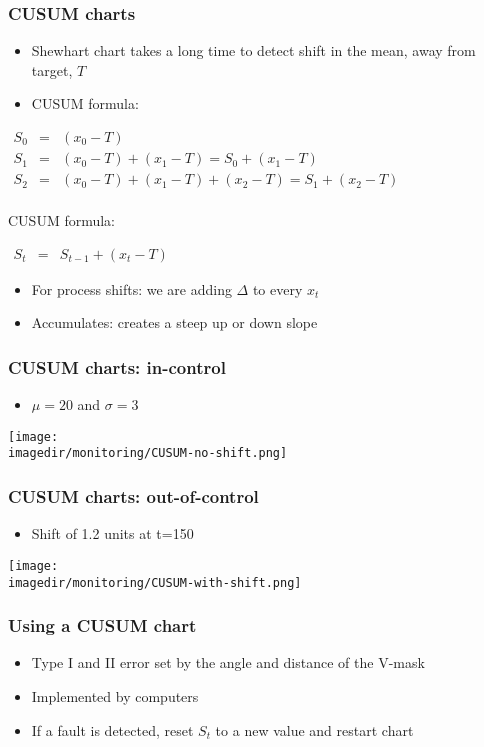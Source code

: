 \begin{frame}\frametitle{CUSUM charts}
	\begin{itemize}
		\item	Shewhart chart takes a long time to detect shift in the mean, away from target, $T$ 
		\item	CUSUM formula: 
	\end{itemize}
	$ 
	\begin{array}{rcl}
		S_0 &=& (x_0 - T) \\
		S_1 &=& (x_0 - T) + (x_1 - T) = S_0 + (x_1 - T) \\
		S_2 &=& (x_0 - T) + (x_1 - T) + (x_2 - T) = S_1 + (x_2 - T) \\
	\end{array}
	$
	\begin{block}
		{CUSUM formula:} 
		\begin{center}
			$ 
			\begin{array}{rcl}
				S_t &=& S_{t-1} + (x_t - T) 
			\end{array}
			$ 
		\end{center}
	\end{block}
	\begin{itemize}
		\item	For process shifts: we are adding $\Delta$ to every $x_t$ 
		\item	Accumulates: creates a steep up or down slope 
	\end{itemize}
\end{frame}

\begin{frame}\frametitle{CUSUM charts: in-control}
	\begin{itemize}
		\item	$\mu=20$ and $\sigma=3$ 
	\end{itemize}
	
	\texttt{[image: \\imagedir/monitoring/CUSUM-no-shift.png]}
\end{frame}

\begin{frame}\frametitle{CUSUM charts: out-of-control}
	\begin{itemize}
		\item	Shift of 1.2 units at t=150 
	\end{itemize}
	
	\texttt{[image: \\imagedir/monitoring/CUSUM-with-shift.png]}
\end{frame}

\begin{frame}\frametitle{Using a CUSUM chart}
	\begin{itemize}
		\item	Type I and II error set by the angle and distance of the V-mask 
		\item	Implemented by computers 
		\item	If a fault is detected, reset $S_t$ to a new value and restart chart 
	\end{itemize}
\end{frame}

